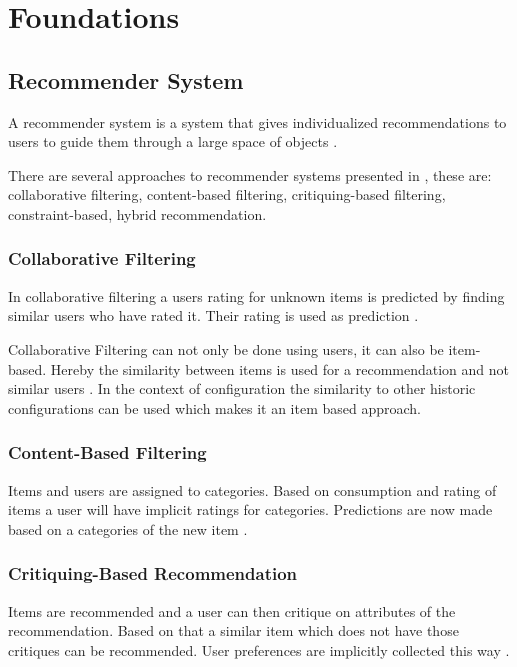 \chapter{Foundations}
\label{ch:Foundations}


\section{Recommender System}
\label{sec:Foundations:RecommenderSystem}

A recommender system is a system that gives individualized recommendations to users to guide them through a large space of objects \cite[~ p. 331]{burkeHybridRecommenderSystems2002}.

There are several approaches to recommender systems presented in \cite{felfernigGroupRecommenderSystems2018}, these are: collaborative filtering, content-based filtering, critiquing-based filtering, constraint-based, hybrid recommendation.

\subsection{Collaborative Filtering}
In collaborative filtering a users rating for unknown items is predicted by finding similar users who have rated it. Their rating is used as prediction
\cite[~ pp. 7, 8]{felfernigDecisionTasksBasic2018}.

Collaborative Filtering can not only be done using users, it can also be item-based. Hereby the similarity between items is used for a recommendation and not similar users \cite{ricciRecommenderSystemsHandbook2015}. In the context of configuration the similarity to other historic configurations can be used which makes it an item based approach. 


\subsection{Content-Based Filtering}
Items and users are assigned to categories. Based on consumption and rating of items a user will have implicit ratings for categories. Predictions are now made based on a categories of the new item \cite[~ pp. 10, 11]{felfernigDecisionTasksBasic2018}.

\subsection{Critiquing-Based Recommendation}
Items are recommended and a user can then critique on attributes of the recommendation. Based on that a similar item which does not have those critiques can be recommended. User preferences are implicitly collected this way \cite{knijnenburgEachHisOwn2011}.

